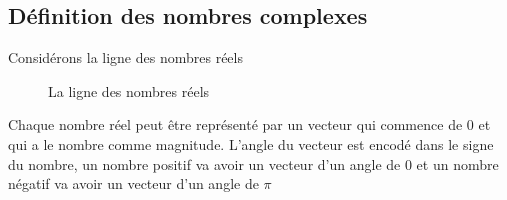 

\subsection{Définition des nombres complexes}
Considérons la ligne des nombres réels
\begin{figure}[!htbp]
    \begin{center}
        \def\numberLineLastNumber{7}
    \end{center}
    \caption{La ligne des nombres réels}
\end{figure}
\begin{remark}
    Chaque nombre réel peut être représenté par un vecteur qui commence de 0 et qui a le nombre comme magnitude. L'angle du vecteur est encodé dans le signe du nombre, un nombre positif va avoir un vecteur d'un angle de 0 et un nombre négatif va avoir un vecteur d'un angle de $\pi$
\end{remark}

